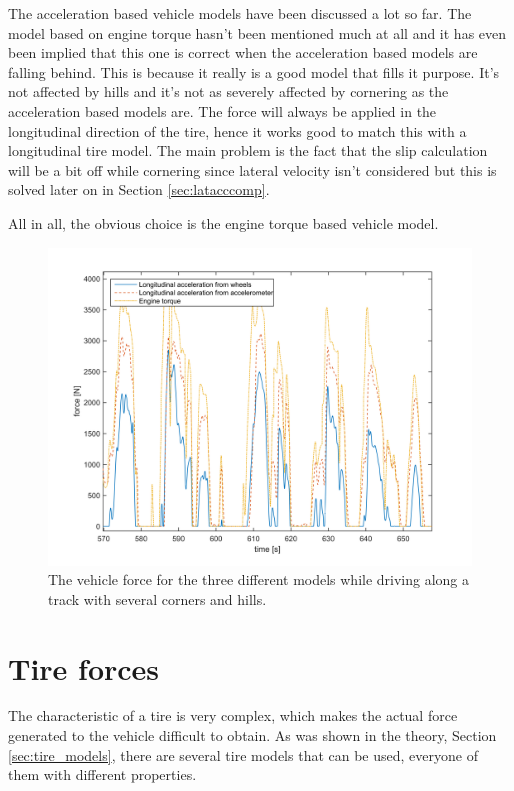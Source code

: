 The acceleration based vehicle models have been discussed a lot so far. The model based on engine torque hasn't been mentioned much at all and it has even been implied that this one is correct when the acceleration based models are falling behind. This is because it really is a good model that fills it purpose. It's not affected by hills and it's not as severely affected by cornering as the acceleration based models are. The force will always be applied in the longitudinal direction of the tire, hence it works good to match this with a longitudinal tire model. The main problem is the fact that the slip calculation will be a bit off while cornering since lateral velocity isn't considered but this is solved later on in Section \ref{sec:latacccomp}. 

All in all, the obvious choice is the engine torque based vehicle model.

\begin{figure}[h]
	\centering
	\includegraphics[width=1\textwidth]{Pictures/vehicle_model_comp_mm2}
	\caption{The vehicle force for the three different models while driving along a track with several corners and hills.}
	\label{vehicle_model_comp_mm2}
\end{figure}

\section{Tire forces}
\label{tire_forces}
The characteristic of a tire is very complex, which makes the actual force generated to the vehicle difficult to obtain. As was shown in the theory, Section \ref{sec:tire_models}, there are several tire models that can be used, everyone of them with different properties.

